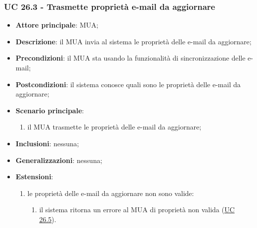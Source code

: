     \subsubsection{UC 26.3 - Trasmette proprietà e-mail da aggiornare} \label{sec:UC26.3}
    \begin{itemize}
        \item \textbf{Attore principale}: MUA;
        \item \textbf{Descrizione}: il MUA invia al sistema le proprietà delle e-mail da aggiornare;
        \item \textbf{Precondizioni}: il MUA sta usando la funzionalità di sincronizzazione delle e-mail;
        \item \textbf{Postcondizioni}: il sistema conosce quali sono le proprietà delle e-mail da aggiornare;
        \item \textbf{Scenario principale}:
            \begin{enumerate}
                \item il MUA trasmette le proprietà delle e-mail da aggiornare;
            \end{enumerate}
        \item \textbf{Inclusioni}: nessuna;
        \item \textbf{Generalizzazioni}: nessuna;
        \item \textbf{Estensioni}:
            \begin{enumerate}[label=\alph*.]
                \item le proprietà delle e-mail da aggiornare non sono valide:
                \begin{enumerate}[label=\arabic*.]
                    \item il sistema ritorna un errore al MUA di proprietà non valida (\hyperref[sec:UC26.5]{UC 26.5}).
                \end{enumerate}
            \end{enumerate}
    \end{itemize}


